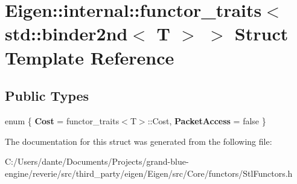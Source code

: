 \hypertarget{struct_eigen_1_1internal_1_1functor__traits_3_01std_1_1binder2nd_3_01_t_01_4_01_4}{}\section{Eigen\+::internal\+::functor\+\_\+traits$<$ std\+::binder2nd$<$ T $>$ $>$ Struct Template Reference}
\label{struct_eigen_1_1internal_1_1functor__traits_3_01std_1_1binder2nd_3_01_t_01_4_01_4}
\subsection*{Public Types}
\begin{DoxyCompactItemize}
\item 
\mbox{\label{struct_eigen_1_1internal_1_1functor__traits_3_01std_1_1binder2nd_3_01_t_01_4_01_4_a76dce37825136dbc46d820e524309fbf}} 
enum \{ {\bfseries Cost} = functor\+\_\+traits$<$T$>$\+::Cost, 
{\bfseries Packet\+Access} = false
 \}
\end{DoxyCompactItemize}


The documentation for this struct was generated from the following file\+:\begin{DoxyCompactItemize}
\item 
C\+:/\+Users/dante/\+Documents/\+Projects/grand-\/blue-\/engine/reverie/src/third\+\_\+party/eigen/\+Eigen/src/\+Core/functors/Stl\+Functors.\+h\end{DoxyCompactItemize}
